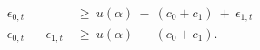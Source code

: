 \begin{equation}
\begin{split}
     \epsilon_{0, t} \
     & \geq \ u(\alpha) \ - \ (c_{0} + c_{1}) \ + \ \epsilon_{1, t} \\
     \epsilon_{0, t} \ - \ \epsilon_{1, t} \ 
     & \geq \ u(\alpha) \ - \ (c_{0} + c_{1}).
\end{split}
\label{Equation:DCDP-Model_Decision-Rule}
\end{equation}